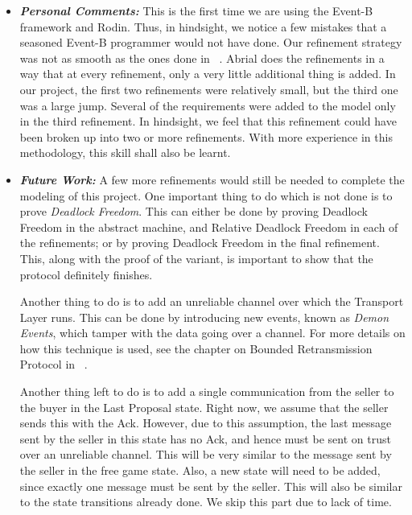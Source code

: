 \begin{itemize}
\item
  \emph{\bf Personal Comments:} This is the first time we are using the Event-B framework and Rodin. Thus, in hindsight, we notice a few mistakes that a seasoned Event-B 
  programmer would not have done. Our refinement strategy was not as smooth as the ones done in ~\cite{AbrialBook}. Abrial does the refinements in a way that at every 
  refinement, only a very little additional thing is added. In our project, the first two refinements were relatively small, but the third one was a large jump. Several of 
  the requirements were added to the model only in the third refinement. In hindsight, we feel that this refinement could have been broken up into two or more refinements. With more experience in this methodology, this skill shall also be learnt.
\item
  \emph{\bf Future Work:} A few more refinements would still be needed to complete the modeling of this project. One important thing to do which is not done is to prove 
  \emph{Deadlock Freedom}. This can either be done by proving Deadlock Freedom in the abstract machine, and Relative Deadlock Freedom in each of the refinements; or by 
  proving Deadlock Freedom in the final refinement. This, along with the proof of the variant, is important to show that the protocol definitely finishes.

  Another thing to do is to add an unreliable channel over which the Transport Layer runs. This can be done by introducing new events, known as \emph{Demon Events}, which 
  tamper with the data going over a channel. For more details on how this technique is used, see the chapter on Bounded Retransmission Protocol in ~\cite{AbrialBook}.

Another thing left to do is to add a single communication from the seller to the buyer in the Last Proposal state. Right now, we assume that the seller sends this with the Ack. However, due to this assumption, the last message sent by the seller in this state has no Ack, and hence must be sent on trust over an unreliable channel. This will be very similar to the message sent by the seller in the free game state. Also, a new state will need to be added, since exactly one message must be sent by the seller. This will also be similar to the state transitions already done. We skip this part due to lack of time. 
\end{itemize}


